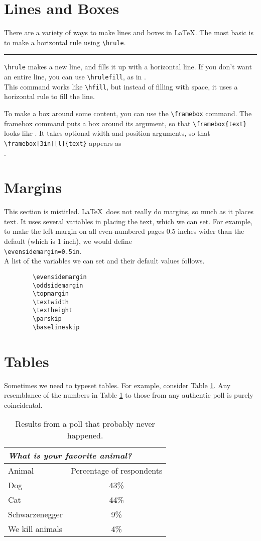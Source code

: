 \documentclass[UTF8]{article}
\begin{document}
	\section{Lines and Boxes}
	There are a variety of ways to make lines and boxes in \LaTeX.
	The most basic is to make a horizontal rule using \verb(\hrule(.
	\hrule
	\verb(\hrule( makes a new line, and fills it up with a horizontal line.
	If you don't want an entire line, you can use \verb(\hrulefill(, as
	in \hrulefill.\\
	This command works like \verb(\hfill(, but instead of filling with
	space, it uses a horizontal rule to fill the line.
	
	To make a box around some content, you can use the \verb(\framebox(
	command.  The framebox command puts a box around its argument,
	so that \verb(\framebox{text}( looks like . It takes
	optional width and position arguments, so that
	\verb(\framebox[3in][l]{text}(
	appears as \\
	.
	
	\section{Margins}
	This section is mistitled.  \LaTeX\ does not really do margins,
	so much as it places text.  It uses several variables in placing the
	text, which we can set.  For example, to make the left margin on
	all even-numbered pages 0.5 inches wider than the default (which is 
	1 inch), we would define\\
	\verb(\evensidemargin=0.5in(.\\
	A list of the variables we can set and their default values follows.
	\begin{verbatim}
		\evensidemargin
		\oddsidemargin
		\topmargin
		\textwidth
		\textheight
		\parskip
		\baselineskip
	\end{verbatim}
	
	\section{Tables}
	Sometimes we need to typeset tables.  For example, 
	consider Table \ref{animaltable}.  
	Any resemblance of the numbers in 
	Table \ref{animaltable} to those from any authentic poll is purely coincidental.
	\begin{table}
		\begin{center}
			\caption{\label{animaltable}
				Results from a poll that probably never happened.}
			\begin{tabular}{||l|c||}
				\hline
				\cline{1-2}
				\multicolumn{2}{||l||}{{\it What is your favorite animal?}}\\
				\hline
				Animal & Percentage of respondents\\
				\hline
				Dog & 43\%\\
				Cat & 44\%\\
				Schwarzenegger & 9\%\\
				We kill animals & 4\%\\
				\hline
				\hline
			\end{tabular}
		\end{center}
	\end{table}
	
\end{document}
